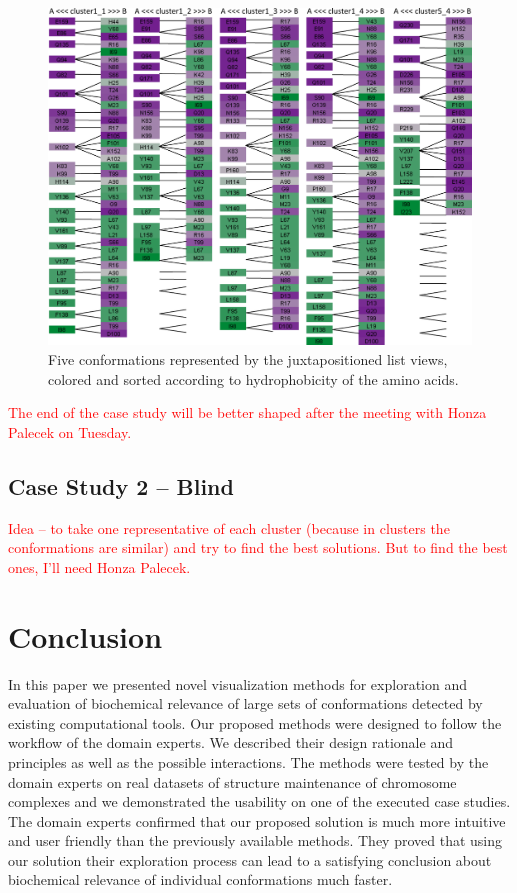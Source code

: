 \documentclass[journal]{vgtc}                %
\begin{document}
\begin{figure}[bt]
  \centering
  \includegraphics[width=1.0\linewidth]{case3.pdf}
  \caption{Five conformations represented by the juxtapositioned list views, colored and sorted according to hydrophobicity of the amino acids.}
  \label{fig:case3}
\end{figure}

\textcolor{red}{The end of the case study will be better shaped after the meeting with Honza Palecek on Tuesday.}

\subsection{Case Study 2 -- Blind}
\textcolor{red}{Idea -- to take one representative of each cluster (because in clusters the conformations are similar) and try to find the best solutions. But to find the best ones, I'll need Honza Palecek.}

\section{Conclusion}
In this paper we presented novel visualization methods for exploration and evaluation of biochemical relevance of large sets of conformations detected by existing computational tools.
Our proposed methods were designed to follow the workflow of the domain experts.
We described their design rationale and principles as well as the possible interactions. 
The methods were tested by the domain experts on real datasets of structure maintenance of chromosome complexes and we demonstrated the usability on one of the executed case studies.
The domain experts confirmed that our proposed solution is much more intuitive and user friendly than the previously available methods.
They proved that using our solution their exploration process can lead to a satisfying conclusion about biochemical relevance of individual conformations much faster.
\end{document}
